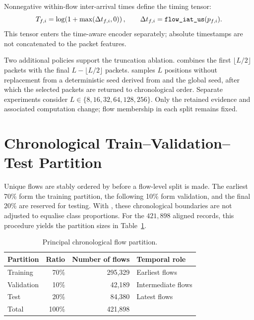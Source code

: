 \documentclass[11pt,fleqn]{report}
\begin{document}
Nonnegative within-flow inter-arrival times define the timing tensor:
\begin{equation}
    T_{f,i}=\log\!\left(1+\max(\Delta t_{f,i},0)\right),
    \qquad
    \Delta t_{f,i}=\datasetfield{flow_iat_us}(p_{f,i}).
    \label{eq:time_tensor}
\end{equation}
This tensor enters the time-aware encoder separately; absolute timestamps are not concatenated to the packet features.

Two additional policies support the truncation ablation.  combines the first $\lfloor L/2\rfloor$ packets with the final $L-\lfloor L/2\rfloor$ packets.  samples $L$ positions without replacement from a deterministic seed derived from  and the global seed, after which the selected packets are returned to chronological order. Separate experiments consider $L\in\{8,16,32,64,128,256\}$. Only the retained evidence and associated computation change; flow membership in each split remains fixed.

\section{Chronological Train--Validation--Test Partition}
\label{subsec:chronological_partition}

Unique flows are stably ordered by  before a flow-level split is made. The earliest 70\% form the training partition, the following 10\% form validation, and the final 20\% are reserved for testing. With , these chronological boundaries are not adjusted to equalise class proportions. For the $421{,}898$ aligned records, this procedure yields the partition sizes in Table~\ref{tab:chronological_split}.

\begin{table}[H]
    \centering
    \caption{Principal chronological flow partition.}
    \label{tab:chronological_split}
    \begin{tabular}{@{}lrrl@{}}
        \toprule
        Partition & Ratio & Number of flows & Temporal role \\
        \midrule
        Training & 70\% & 295,329 & Earliest flows \\
        Validation & 10\% & 42,189 & Intermediate flows \\
        Test & 20\% & 84,380 & Latest flows \\
        \midrule
        Total & 100\% & 421,898 & \\
        \bottomrule
    \end{tabular}
\end{table}
\end{document}
